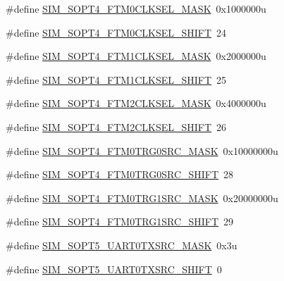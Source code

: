 \begin{DoxyCompactItemize}
\item 
\#define \hyperlink{group___s_i_m___register___masks_gaac823c598ac790d9eeeeb7ddb86d1657}{S\+I\+M\+\_\+\+S\+O\+P\+T4\+\_\+\+F\+T\+M0\+C\+L\+K\+S\+E\+L\+\_\+\+M\+A\+SK}~0x1000000u
\item 
\#define \hyperlink{group___s_i_m___register___masks_ga77c42e9023c3ed2d759431e2c072860f}{S\+I\+M\+\_\+\+S\+O\+P\+T4\+\_\+\+F\+T\+M0\+C\+L\+K\+S\+E\+L\+\_\+\+S\+H\+I\+FT}~24
\item 
\#define \hyperlink{group___s_i_m___register___masks_ga0cd5cb92a9ea79e8227693c793ee5983}{S\+I\+M\+\_\+\+S\+O\+P\+T4\+\_\+\+F\+T\+M1\+C\+L\+K\+S\+E\+L\+\_\+\+M\+A\+SK}~0x2000000u
\item 
\#define \hyperlink{group___s_i_m___register___masks_ga04492b54a5b581b3bdef8568bdbabf91}{S\+I\+M\+\_\+\+S\+O\+P\+T4\+\_\+\+F\+T\+M1\+C\+L\+K\+S\+E\+L\+\_\+\+S\+H\+I\+FT}~25
\item 
\#define \hyperlink{group___s_i_m___register___masks_ga8e9ace9af53ead470265ca2338402dae}{S\+I\+M\+\_\+\+S\+O\+P\+T4\+\_\+\+F\+T\+M2\+C\+L\+K\+S\+E\+L\+\_\+\+M\+A\+SK}~0x4000000u
\item 
\#define \hyperlink{group___s_i_m___register___masks_ga4b5b8e4dc00734623d8a16db8ff0510c}{S\+I\+M\+\_\+\+S\+O\+P\+T4\+\_\+\+F\+T\+M2\+C\+L\+K\+S\+E\+L\+\_\+\+S\+H\+I\+FT}~26
\item 
\#define \hyperlink{group___s_i_m___register___masks_ga14159dfb09e3ad4c1b9f2f4950a3f4a6}{S\+I\+M\+\_\+\+S\+O\+P\+T4\+\_\+\+F\+T\+M0\+T\+R\+G0\+S\+R\+C\+\_\+\+M\+A\+SK}~0x10000000u
\item 
\#define \hyperlink{group___s_i_m___register___masks_ga76c7302a8f939758f0b68fb05ea6dd08}{S\+I\+M\+\_\+\+S\+O\+P\+T4\+\_\+\+F\+T\+M0\+T\+R\+G0\+S\+R\+C\+\_\+\+S\+H\+I\+FT}~28
\item 
\#define \hyperlink{group___s_i_m___register___masks_ga427b99978dda3f6bf1c0a97559315276}{S\+I\+M\+\_\+\+S\+O\+P\+T4\+\_\+\+F\+T\+M0\+T\+R\+G1\+S\+R\+C\+\_\+\+M\+A\+SK}~0x20000000u
\item 
\#define \hyperlink{group___s_i_m___register___masks_gacf67b2d7908669c38dfb06eff3c7fa8a}{S\+I\+M\+\_\+\+S\+O\+P\+T4\+\_\+\+F\+T\+M0\+T\+R\+G1\+S\+R\+C\+\_\+\+S\+H\+I\+FT}~29
\item 
\#define \hyperlink{group___s_i_m___register___masks_ga11646c1292cb7aab3128e1e563847e32}{S\+I\+M\+\_\+\+S\+O\+P\+T5\+\_\+\+U\+A\+R\+T0\+T\+X\+S\+R\+C\+\_\+\+M\+A\+SK}~0x3u
\item 
\#define \hyperlink{group___s_i_m___register___masks_ga0220b88df4a0747579d24b77f4db4e67}{S\+I\+M\+\_\+\+S\+O\+P\+T5\+\_\+\+U\+A\+R\+T0\+T\+X\+S\+R\+C\+\_\+\+S\+H\+I\+FT}~0

\end{DoxyCompactItemize}

